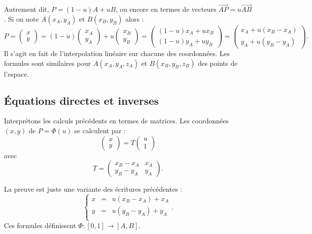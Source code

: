 \documentclass[11pt,class=report,crop=false]{standalone}
\begin{document}
Autrement dit, $P = (1-u) A  + u B$, ou encore en termes de vecteurs $\vec{AP} = u \vec{AB}$.
Si on note $A(x_A,y_A)$ et $B(x_B,y_B)$ alors : 
$$
P = \begin{pmatrix} x \\ y \end{pmatrix}
= (1-u) \begin{pmatrix} x_A \\ y_A \end{pmatrix} + u \begin{pmatrix} x_B \\ y_B \end{pmatrix}
= \begin{pmatrix} (1-u)x_A + u x_B \\ (1-u)y_A + u y_B \end{pmatrix}
= \begin{pmatrix} x_A + u (x_B-x_A) \\ y_A + u (y_B-y_A) \end{pmatrix}
.$$
Il s'agit en fait de l'interpolation linéaire sur chacune des coordonnées.
Les formules sont similaires pour $A(x_A,y_A,z_A)$ et $B(x_B,y_B,z_B)$ des points de l'espace.


\subsection{Équations directes et inverses}

Interprétons les calculs précédents en termes de matrices. Les coordonnées $(x,y)$ de $P = \Phi(u)$ se calculent par :
$$\begin{pmatrix} x \\ y \end{pmatrix} = T \begin{pmatrix} u \\ 1 \end{pmatrix}$$
avec 
$$T = \begin{pmatrix}
x_B-x_A & x_A \\
y_B-y_A & y_A 	
\end{pmatrix}.$$

La preuve est juste une variante des écritures précédentes :
$$\left\{
\begin{array}{rcl}
	x &=& u(x_B - x_A) + x_A \\
	y &=& u(y_B - y_A) + y_A \\	
\end{array}
\right..$$
Ces formules définissent $\Phi : [0,1] \to [A,B]$.
\end{document}
